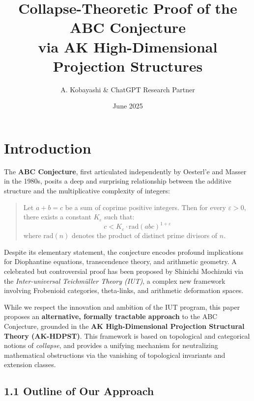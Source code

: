 \documentclass[11pt]{article}
\title{Collapse-Theoretic Proof of the ABC Conjecture\\via AK High-Dimensional Projection Structures}
\author{A. Kobayashi \& ChatGPT Research Partner}
\date{June 2025}
\begin{document}
\maketitle

\section{Introduction}

The \textbf{ABC Conjecture}, first articulated independently by Oesterl'e and Masser in the 1980s, posits a deep and surprising relationship between the additive structure and the multiplicative complexity of integers:
\begin{quote}
    Let $a + b = c$ be a sum of coprime positive integers. Then for every $\varepsilon > 0$, there exists a constant $K_\varepsilon$ such that:
    \[ c < K_\varepsilon \cdot \mathrm{rad}(abc)^{1+\varepsilon} \]
    where $\mathrm{rad}(n)$ denotes the product of distinct prime divisors of $n$.
\end{quote}

Despite its elementary statement, the conjecture encodes profound implications for Diophantine equations, transcendence theory, and arithmetic geometry. A celebrated but controversial proof has been proposed by Shinichi Mochizuki via the \emph{Inter-universal Teichmüller Theory (IUT)}, a complex new framework involving Frobenioid categories, theta-links, and arithmetic deformation spaces.

While we respect the innovation and ambition of the IUT program, this paper proposes an \textbf{alternative, formally tractable approach} to the ABC Conjecture, grounded in the \textbf{AK High-Dimensional Projection Structural Theory (AK-HDPST)}. This framework is based on topological and categorical notions of \emph{collapse}, and provides a unifying mechanism for neutralizing mathematical obstructions via the vanishing of topological invariants and extension classes.

\subsection*{1.1 Outline of Our Approach}
\end{document}
